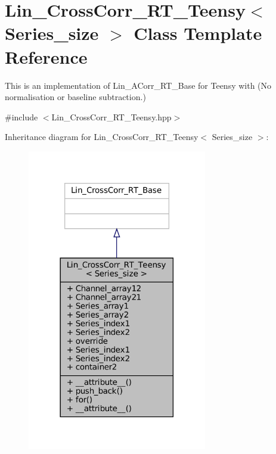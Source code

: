 \hypertarget{classLin__CrossCorr__RT__Teensy}{}\section{Lin\+\_\+\+Cross\+Corr\+\_\+\+R\+T\+\_\+\+Teensy$<$ Series\+\_\+size $>$ Class Template Reference}
\label{classLin__CrossCorr__RT__Teensy}


This is an implementation of Lin\+\_\+\+A\+Corr\+\_\+\+R\+T\+\_\+\+Base for Teensy with {\bfseries }(No normalisation or baseline subtraction.)  




{\ttfamily \#include $<$Lin\+\_\+\+Cross\+Corr\+\_\+\+R\+T\+\_\+\+Teensy.\+hpp$>$}



Inheritance diagram for Lin\+\_\+\+Cross\+Corr\+\_\+\+R\+T\+\_\+\+Teensy$<$ Series\+\_\+size $>$\+:\nopagebreak
\begin{figure}[H]
\begin{center}
\leavevmode
\includegraphics[width=222pt]{de/df6/classLin__CrossCorr__RT__Teensy__inherit__graph}
\end{center}
\end{figure}


